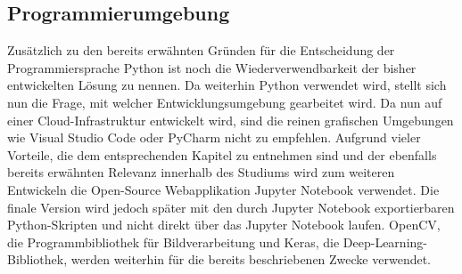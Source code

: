 \documentclass[12pt, a4paper]{scrbook}
\begin{document}
\subsection{Programmierumgebung}
Zusätzlich zu den bereits erwähnten Gründen für die Entscheidung der Programmiersprache Python ist noch die Wiederverwendbarkeit der bisher entwickelten Lösung zu nennen. Da weiterhin Python verwendet wird, stellt sich nun die Frage, mit welcher Entwicklungsumgebung gearbeitet wird. Da nun auf einer Cloud-Infrastruktur entwickelt wird, sind die reinen grafischen Umgebungen wie Visual Studio Code oder PyCharm nicht zu empfehlen. Aufgrund vieler Vorteile, die dem entsprechenden Kapitel zu entnehmen sind und der ebenfalls bereits erwähnten Relevanz innerhalb des Studiums wird zum weiteren Entwickeln die Open-Source Webapplikation Jupyter Notebook verwendet. Die finale Version wird jedoch später mit den durch Jupyter Notebook exportierbaren Python-Skripten und nicht direkt über das Jupyter Notebook laufen. OpenCV, die Programmbibliothek für Bildverarbeitung und Keras, die Deep-Learning-Bibliothek, werden weiterhin für die bereits beschriebenen Zwecke verwendet.
\end{document}
